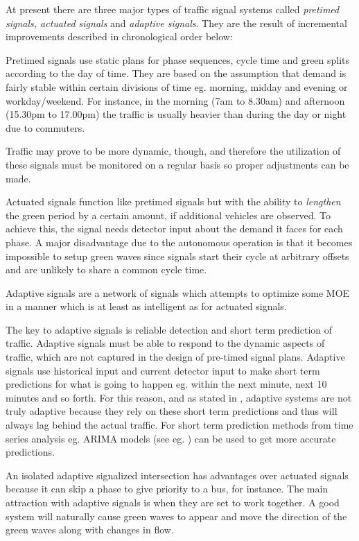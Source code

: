 \label{sec:signal_types}

At present there are three major types of traffic signal systems
called {\em pretimed signals, actuated signals} and {\em adaptive
signals}. They are the result of incremental improvements described in
chronological order below:

Pretimed signals use static plans for phase sequences, cycle time and
green splits according to the day of time.
\label{insec:pretimed}
They are based on the assumption that demand is fairly stable within
certain divisions of time eg. morning, midday and evening or
workday/weekend. For instance, in the morning (7am to 8.30am) and
afternoon (15.30pm to 17.00pm) the traffic is usually heavier than
during the day or night due to commuters.

Traffic may prove to be more dynamic, though, and therefore the
utilization of these signals must be monitored on a regular basis so
proper adjustments can be made.

Actuated signals function like pretimed signals but with the ability
to \textit{lengthen} the green period by a certain amount, if
additional vehicles are observed.
\label{insec:actuated}
To achieve this, the signal needs detector input about the demand it
faces for each phase.  A major disadvantage due to the autonomous
operation is that it becomes impossible to setup green waves since
signals start their cycle at arbitrary offsets and are unlikely to
share a common cycle time.

Adaptive signals are a network of signals which attempts to
optimize some MOE in a manner which is at least as intelligent as for
actuated signals.

The key to adaptive signals is reliable detection and short term
prediction of traffic. Adaptive signals must be able to respond to the
dynamic aspects of traffic, which are not captured in the design of
pre-timed signal plans. Adaptive signals use historical input and
current detector input to make short term predictions for what is
going to happen eg. within the next minute, next 10 minutes and so
forth. For this reason, and as stated in \cite{1}, adaptive systems
are not truly adaptive because they rely on these short term
predictions and thus will always lag behind the actual traffic. For
short term prediction methods from time series analysis eg. ARIMA
models (see eg. \cite{shortpredict}) can be used to get more accurate
predictions.

An isolated adaptive signalized intersection has advantages over
actuated signals because it can skip a phase to give priority to a
bus, for instance. The main attraction with adaptive signals is when
they are set to work together. A good system will naturally cause
green waves to appear and move the direction of the green waves along
with changes in flow.
